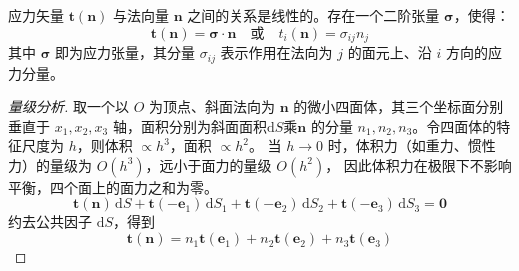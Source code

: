 \begin{principle}[柯西应力原理]
    应力矢量 $\mathbf{t}(\mathbf{n})$ 与法向量 $\mathbf{n}$ 之间的关系是线性的。存在一个二阶张量 $\boldsymbol{\sigma}$，使得：
    \begin{equation}
    \mathbf{t}(\mathbf{n}) = \boldsymbol{\sigma} \cdot \mathbf{n}\quad \text{或} \quad t_i(\mathbf{n}) = \sigma_{ij} n_j
     \end{equation}
     其中 $\boldsymbol{\sigma}$ 即为应力张量，其分量 $\sigma_{ij}$ 表示作用在法向为 $j$ 的面元上、沿 $i$ 方向的应力分量。
\end{principle}
\begin{proof}[量级分析]
取一个以 $O$ 为顶点、斜面法向为 $\mathbf{n}$ 的微小四面体，其三个坐标面分别垂直于
 $x_1, x_2, x_3$ 轴，面积分别为斜面面积\(\mathrm{d}S\)乘$\mathbf{n}$ 的分量 $n_1, n_2, n_3$。令四面体的特征尺度为 $h$，则体积 $\propto h^3$，面积 $\propto h^2$。
 当 $h \to 0$ 时，体积力（如重力、惯性力）的量级为 $O(h^3)$，远小于面力的量级 $O(h^2)$，
 因此体积力在极限下不影响平衡，四个面上的面力之和为零。
 \[
\mathbf{t}(\mathbf{n}) \, \mathrm{d}S + \mathbf{t}(-\mathbf{e}_1) \, \mathrm{d}S_1 + \mathbf{t}(-\mathbf{e}_2) \, \mathrm{d}S_2 + \mathbf{t}(-\mathbf{e}_3) \, \mathrm{d}S_3 = \mathbf{0}
\]
约去公共因子 \(\mathrm{d}S\)，得到
\[
\mathbf{t}(\mathbf{n}) = n_1 \mathbf{t}(\mathbf{e}_1) + n_2 \mathbf{t}(\mathbf{e}_2) + n_3 \mathbf{t}(\mathbf{e}_3)
\]
\end{proof}

